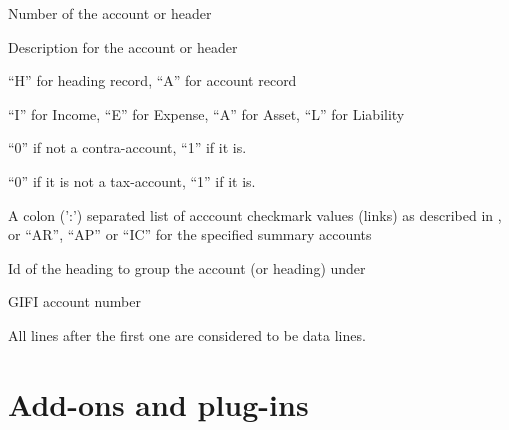 \begin{description}[style=nextline]
\item [accno] Number of the account or header
\item [desc] Description for the account or header
\item [charttype] ``H'' for heading record, ``A'' for account record
\item [category] ``I'' for Income, ``E'' for Expense, ``A'' for Asset, ``L'' for Liability
\item [contra] ``0'' if not a contra-account, ``1'' if it is.
\item [tax] ``0'' if it is not a tax-account, ``1'' if it is.
\item [link] A colon (':') separated list of acccount checkmark values (links) as described
    in , or ``AR'', ``AP'' or ``IC'' for the specified summary accounts
\item [heading] Id of the heading to group the account (or heading) under
\item [gifi] GIFI account number
\end{description}

All lines after the first one are considered to be data lines.

\chapter{Add-ons and plug-ins}
\label{cha-customization-add-ons}


